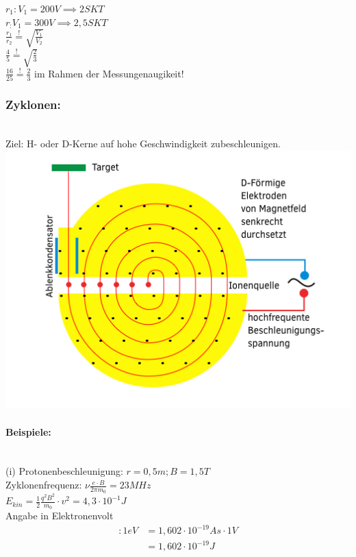   $r_1: V_1=200V\implies 2SKT$\\
  
  $r_: V_1=300V\implies 2,5SKT$\\
  
  $\frac{r_1}{r_2}\overset{!}{=} \sqrt{\frac{V_1}{V_2}}$\\
  
  $\frac{4}{5}\overset{!}{=}\sqrt{\frac{2}{3}}$\\
  
  $\frac{16}{25}\overset{!}{=}\frac{2}{3}$ \checkmark im Rahmen der Messungenaugikeit!
  
  \subsubsection{Zyklonen:}\leavevmode \\
  Ziel: H- oder D-Kerne auf hohe Geschwindigkeit zubeschleunigen.\\
  
  \includegraphics[width=0.7\linewidth]{skizzen/16/16_1B03}\\
  
  \paragraph{Beispiele:}\leavevmode \\
  (i) Protonenbeschleunigung: $r=0,5m; B=1,5T$\\
  Zyklonenfrequenz: $\nu\frac{e\cdot B}{2\pi m_0}=23MHz$\\
  
  $E_{kin}=\frac{1}{2}\frac{q^2 B^2}{m_0}\cdot v^2=4,3\cdot 10^{-1}J$\\
  
  Angabe in Elektronenvolt \begin{align}
  	[eV]:1eV&= 1,602\cdot 10^{-19}As \cdot 1V\\
  	&=1,602\cdot 10^{-19}J
  \end{align}\\
  
